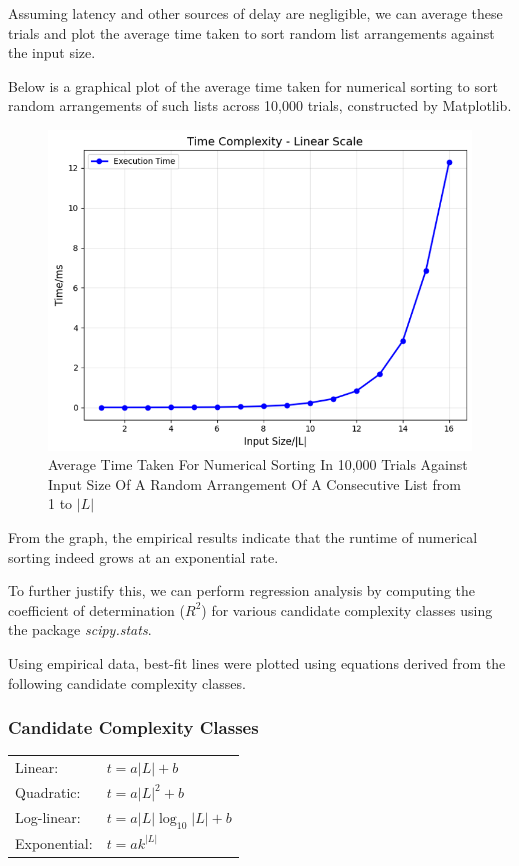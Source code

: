 \documentclass[12pt]{article}
\begin{document}
Assuming latency and other sources of delay are negligible, we can average these trials and plot the average time taken to sort random list arrangements against the input size.

Below is a graphical plot of the average time taken for numerical sorting to sort random arrangements of such lists across 10,000 trials, constructed by Matplotlib.

\begin{figure}[H]
    \centering
    \includegraphics[width=0.75\linewidth]{Time_Complexity.png}
    \caption{Average Time Taken For Numerical Sorting In 10,000 Trials Against Input Size Of A Random Arrangement Of A Consecutive List from 1 to $|L|$}
    \label{fig:placeholder}
\end{figure}

From the graph, the empirical results indicate that the runtime of numerical sorting indeed grows at an exponential rate.

To further justify this, we can perform regression analysis by computing the coefficient of determination ($R^2$) for various candidate complexity classes using the package \emph{scipy.stats}.

Using empirical data, best-fit lines were plotted using equations derived from the following candidate complexity classes.

\begin{center}
\subsubsection{Candidate Complexity Classes}
\begin{tabular}{ll}
Linear: & $t = a|L| + b$ \\
Quadratic: & $t = a|L|^2 + b$ \\
Log-linear: & $t = a|L|\log_{10}|L| + b$ \\
Exponential: & $t = a k^{|L|}$
\end{tabular}
\end{center}
\end{document}
